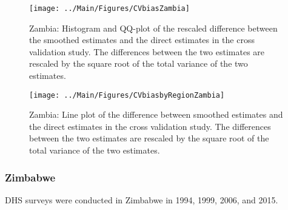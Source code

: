 \documentclass[12pt]{article}\usepackage[]{graphicx}\usepackage[]{color}
\newenvironment{knitrout}{}{} %
\begin{document}
\begin{knitrout}
\color{fgcolor}\begin{figure}[bht]

{\centering \texttt{[image: ../Main/Figures/CVbiasZambia]} 

}

\caption[Zambia]{Zambia: Histogram and QQ-plot of the rescaled difference between the smoothed estimates and the direct estimates in the cross validation study. The differences between the two estimates are rescaled by the square root of the total variance of the two estimates.}\label{fig:unnamed-chunk-339}
\end{figure}


\end{knitrout}

\begin{knitrout}
\color{fgcolor}\begin{figure}[bht]

{\centering \texttt{[image: ../Main/Figures/CVbiasbyRegionZambia]} 

}

\caption[Zambia]{Zambia: Line plot of the difference between smoothed estimates and the direct estimates in the cross validation study. The differences between the two estimates are rescaled by the square root of the total variance of the two estimates.}\label{fig:unnamed-chunk-340}
\end{figure}


\end{knitrout}



\clearpage
\subsubsection{Zimbabwe}





DHS surveys were conducted in Zimbabwe in 1994, 1999, 2006, and 2015.
\end{document}
